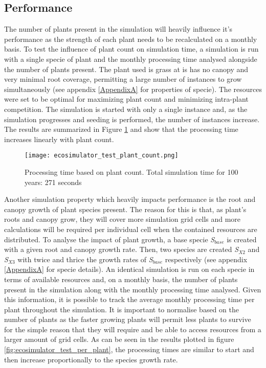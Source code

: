 \subsection{Performance} \label{subsec:ecosytem_performance}

The number of plants present in the simulation will heavily influence it's performance as the strength of each plant needs to be recalculated on a monthly basis. To test the influence of plant count on simulation time, a simulation is run with a single specie of plant and the monthly processing time analysed alongside the number of plants present. The plant used is grass at is has no canopy and very minimal root coverage, permitting a large number of instances to grow simultaneously (see appendix \ref{AppendixA} for properties of specie). The resources were set to be optimal for maximizing plant count and minimizing intra-plant competition. The simulation is started with only a single instance and, as the simulation progresses and seeding is performed, the number of instances increase. The results are summarized in Figure \ref{fig:ecosimulator_test_plant_count} and show that the processing time increases linearly with plant count. \\

\begin{figure}
\center
	\texttt{[image: ecosimulator\_test\_plant\_count.png]}
	\caption{ Processing time based on plant count. Total simulation time for 100 years: 271 seconds}	
	\label{fig:ecosimulator_test_plant_count}
\end{figure}

Another simulation property which heavily impacts performance is the root and canopy growth of plant species present. The reason for this is that, as plant's roots and canopy grow, they will cover more simulation grid cells and more calculations will be required per individual cell when the contained resources are distributed. To analyse the impact of plant growth, a base specie \textit{S$_{base}$} is created with a given root and canopy growth rate. Then, two species are created \textit{S$_{X2}$} and \textit{S$_{X3}$} with twice and thrice the growth rates of \textit{S$_{base}$} respectively (see appendix \ref{AppendixA} for specie details). An identical simulation is run on each specie in terms of available resources and, on a monthly basis, the number of plants present in the simulation along with the monthly processing time analysed. Given this information, it is possible to track the average monthly processing time per plant throughout the simulation. It is important to normalise based on the number of plants as the faster growing plants will permit less plants to survive for the simple reason that they will require and be able to access resources from a larger amount of grid cells. As can be seen in the results plotted in figure \ref{fig:ecosimulator_test_per_plant}, the processing times are similar to start and then increase proportionally to the species growth rate.

